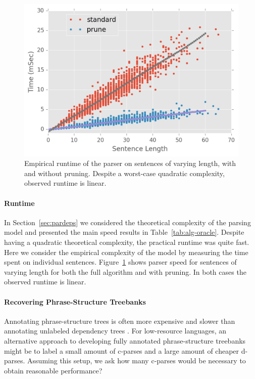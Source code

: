 \documentclass[11pt,letterpaper]{article}
\begin{document}
\begin{figure}
  \centering
  \includegraphics[scale=0.48]{../notebooks/comp}
  \caption{Empirical runtime of the parser on sentences of varying length, with and without pruning. 
  Despite a worst-case quadratic complexity, observed runtime is
  linear.
\label{fig:speed}}
\end{figure}

\paragraph{Runtime}

In Section~\ref{sec:pardeps} we considered the theoretical 
complexity of the parsing model and presented the main 
speed results in Table~\ref{tab:alg-oracle}.
Despite having a quadratic theoretical complexity,
the practical runtime was quite fast.
Here we consider the empirical complexity of the 
model by measuring the time spent on individual sentences. 
Figure~\ref{fig:speed} shows parser speed for
sentences of varying length for both the full algorithm
and  with pruning. In both 
cases the observed runtime is  linear.

\paragraph{Recovering Phrase-Structure Treebanks}
Annotating phrase-structure trees is often more expensive and slower than annotating unlabeled dependency trees \cite{schneider2013framework}. For low-resource languages, an alternative approach to developing fully annotated phrase-structure treebanks might be to label a small amount of c-parses and a large amount of cheaper d-parses. Assuming this setup, we ask how many c-parses would be necessary to obtain reasonable performance?
\end{document}

